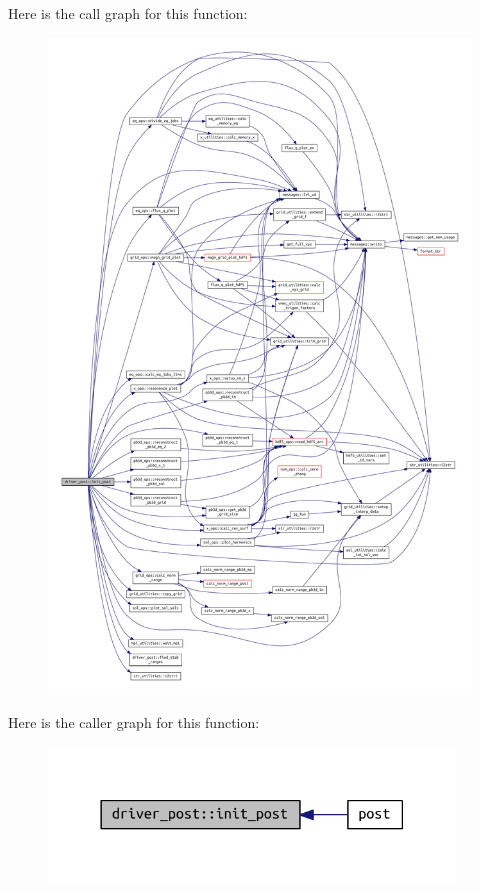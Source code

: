 Here is the call graph for this function\+:
\nopagebreak
\begin{figure}[H]
\begin{center}
\leavevmode
\includegraphics[width=350pt]{namespacedriver__post_af527706d4e696d4e507443d2f74194ef_cgraph}
\end{center}
\end{figure}
Here is the caller graph for this function\+:
\nopagebreak
\begin{figure}[H]
\begin{center}
\leavevmode
\includegraphics[width=306pt]{namespacedriver__post_af527706d4e696d4e507443d2f74194ef_icgraph}
\end{center}
\end{figure}
\mbox{\label{namespacedriver__post_a5d76f87f131e21b4d74fd5f4a7bbbd6b}} 
